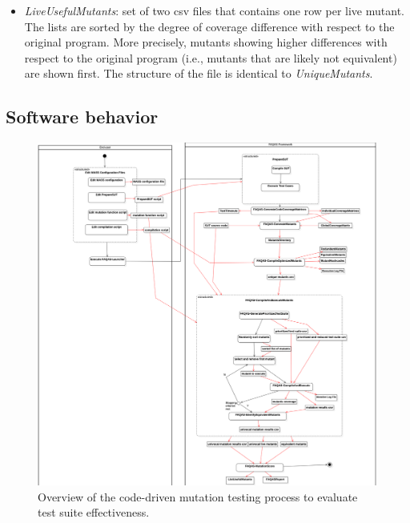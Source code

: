 \begin{itemize}
{\begin{itemize}
		\item \textit{LiveUsefulMutants}: set of two csv files that contains one row per live mutant. The lists are sorted by the degree of coverage difference with respect to the original program. More precisely, mutants showing higher differences with respect to the original program (i.e., mutants that are likely not equivalent) are shown first. The structure of the file is identical to \textit{UniqueMutants}.
	\end{itemize}
	}
\end{itemize}

\clearpage


\subsection{Software behavior}



\begin{figure}[h]
  \centering
	\includegraphics[width=\textwidth]{images/CodeDrivenTestSuiteEvaluation.png}
      \caption{Overview of the code-driven mutation testing process to evaluate test suite effectiveness.}
      \label{fig:process:codeDriven:evaluation}
\end{figure}


